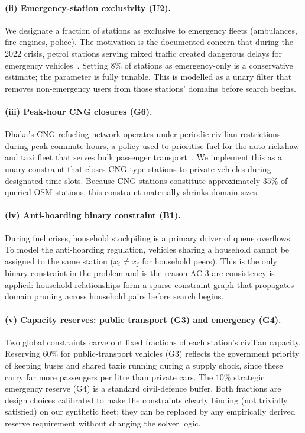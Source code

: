 \documentclass{ai-lab-report}
\begin{document}
\paragraph{(ii) Emergency-station exclusivity (U2).} We designate a fraction of stations as exclusive to emergency fleets (ambulances, fire engines, police). The motivation is the documented concern that during the 2022 crisis, petrol stations serving mixed traffic created dangerous delays for emergency vehicles~\citep{dailystar2022fuelration}. Setting $8\%$ of stations as emergency-only is a conservative estimate; the parameter is fully tunable. This is modelled as a unary filter that removes non-emergency users from those stations' domains before search begins.

\paragraph{(iii) Peak-hour CNG closures (G6).} Dhaka's CNG refueling network operates under periodic civilian restrictions during peak commute hours, a policy used to prioritise fuel for the auto-rickshaw and taxi fleet that serves bulk passenger transport~\citep{tbs2023cctv}. We implement this as a unary constraint that closes CNG-type stations to private vehicles during designated time slots. Because CNG stations constitute approximately $35\%$ of queried OSM stations, this constraint materially shrinks domain sizes.

\paragraph{(iv) Anti-hoarding binary constraint (B1).} During fuel crises, household stockpiling is a primary driver of queue overflows. To model the anti-hoarding regulation, vehicles sharing a household cannot be assigned to the same station ($x_i \neq x_j$ for household peers). This is the only binary constraint in the problem and is the reason AC-3 arc consistency is applied: household relationships form a sparse constraint graph that propagates domain pruning across household pairs before search begins.

\paragraph{(v) Capacity reserves: public transport (G3) and emergency (G4).} Two global constraints carve out fixed fractions of each station's civilian capacity. Reserving $60\%$ for public-transport vehicles (G3) reflects the government priority of keeping buses and shared taxis running during a supply shock, since these carry far more passengers per litre than private cars. The $10\%$ strategic emergency reserve (G4) is a standard civil-defence buffer. Both fractions are design choices calibrated to make the constraints clearly binding (not trivially satisfied) on our synthetic fleet; they can be replaced by any empirically derived reserve requirement without changing the solver logic.
\end{document}
